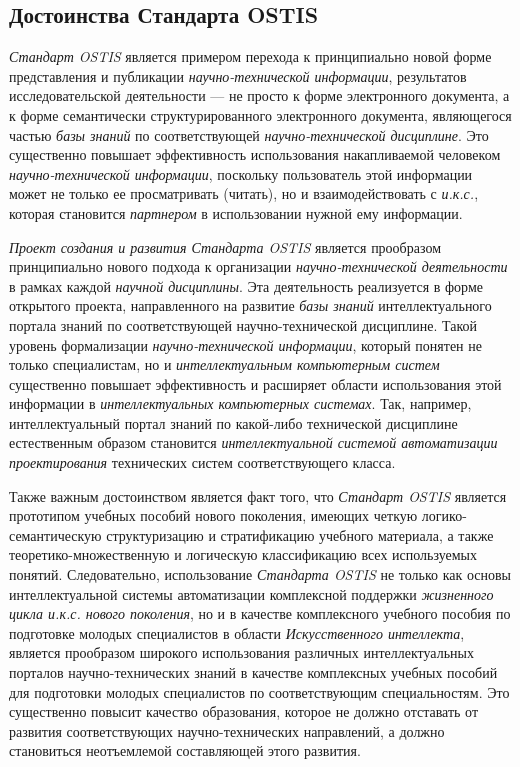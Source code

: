 \subsection{Достоинства Стандарта OSTIS}

\textit{Стандарт OSTIS} является примером перехода к принципиально новой форме  представления и публикации \textit{научно-технической информации}, результатов исследовательской деятельности --- не просто к форме электронного документа, а к форме семантически структурированного электронного документа, являющегося частью \textit{базы знаний} по соответствующей \textit{научно-технической дисциплине}. Это существенно повышает эффективность использования накапливаемой человеком \textit{научно-технической информации}, поскольку пользователь этой информации может не только ее просматривать (читать), но и взаимодействовать с \textit{и.к.с.}, которая становится \textit{партнером} в использовании нужной ему информации.


\textit{Проект создания и развития Стандарта OSTIS} является прообразом принципиально нового подхода к организации \textit{научно-технической деятельности} в рамках каждой \textit{научной дисциплины}. Эта деятельность реализуется в форме открытого проекта, направленного на развитие \textit{базы знаний} интеллектуального портала знаний по соответствующей научно-технической дисциплине. Такой уровень формализации \textit{научно-технической информации}, который понятен не только специалистам, но и \textit{интеллектуальным компьютерным систем} существенно повышает эффективность и расширяет области использования этой информации в \textit{интеллектуальных компьютерных системах}. Так, например, интеллектуальный портал знаний по какой-либо технической дисциплине естественным образом становится \textit{интеллектуальной системой автоматизации проектирования} технических систем соответствующего класса.

Также важным достоинством является факт того, что \textit{Стандарт OSTIS} является прототипом учебных пособий нового поколения, имеющих четкую логико-семантическую структуризацию и стратификацию учебного материала, а также теоретико-множественную и логическую классификацию всех используемых понятий. Следовательно, использование \textit{Стандарта OSTIS} не только как основы интеллектуальной системы автоматизации комплексной поддержки \textit{жизненного цикла и.к.с. нового поколения}, но и в качестве комплексного учебного пособия по подготовке молодых специалистов в области \textit{Искусственного интеллекта}, является прообразом широкого использования различных интеллектуальных порталов научно-технических знаний в качестве комплексных учебных пособий для подготовки молодых специалистов по соответствующим специальностям. Это существенно повысит качество образования, которое не должно отставать от развития соответствующих научно-технических направлений, а должно становиться неотъемлемой составляющей этого развития.

